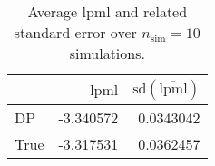 \begin{table}[H]

\caption{Average lpml and related standard error over $n_{\text{sim}} = 10$ simulations.}
\centering
\begin{tabular}[t]{lrr}
\toprule
  & $\overbar{\text{lpml}}$ & $\text{sd}(\overbar{\text{lpml}})$\\
\midrule
DP & -3.340572 & 0.0343042\\
True & -3.317531 & 0.0362457\\
\bottomrule
\end{tabular}
\end{table}